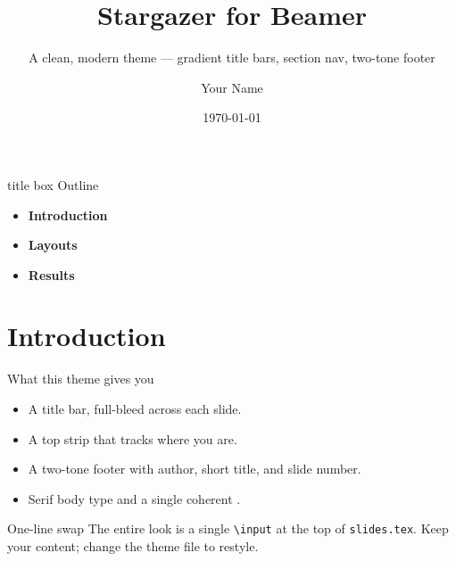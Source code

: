 \documentclass[10pt, aspectratio=169]{beamer}
\title[Stargazer for Beamer]{Stargazer for Beamer}
\subtitle{A clean, modern theme — gradient title bars, section nav, two-tone footer}
\author{Your Name}
\institute{Your Affiliation}
\date{\today}
\begin{document}
{
\begin{frame}[plain]
  \titlepage
\end{frame}}

{
\begin{frame}[plain]
  \vfill
  \begin{beamercolorbox}[wd=\textwidth, sep=14pt, rounded=true, center]{title box}
    {Outline}
  \end{beamercolorbox}
  \vspace{1.6em}
  \begin{itemize}\setlength{\itemsep}{0.9em}
    \item[{\color{SgBlue}\large\bfseries 1.}] {\large\textbf{Introduction}}\\[0.1em]
    \item[{\color{SgBlue}\large\bfseries 2.}] {\large\textbf{Layouts}}\\[0.1em]
    \item[{\color{SgBlue}\large\bfseries 3.}] {\large\textbf{Results}}\\[0.1em]
  \end{itemize}
  \vfill
  {\centering{}\par}
  \vfill
\end{frame}}

\section{Introduction}

\begin{frame}{What this theme gives you}
  \begin{itemize}
    \item A  title bar, full-bleed across each slide.
    \item A top  strip that tracks where you are.
    \item A two-tone footer with author, short title, and slide number.
    \item Serif body type and a single coherent .
  \end{itemize}
  \vfill
  \begin{block}{One-line swap}
    The entire look is a single \texttt{\textbackslash input} at the top of
    \texttt{slides.tex}. Keep your content; change the theme file to restyle.
  \end{block}
  \vfill
\end{frame}
\end{document}
